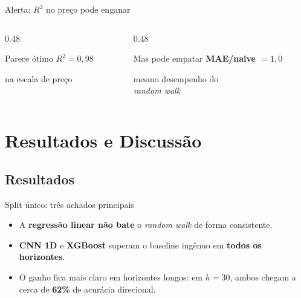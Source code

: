 \documentclass{libs/ufc_format}
\begin{document}
\begin{frame}{Alerta: \(R^2\) no preço pode enganar}
    \begin{columns}
        \begin{column}{0.48\textwidth}
            \begin{exampleblock}{Parece ótimo}
                \centering
                \Large \textbf{\(R^2 = 0{,}98\)}

                \vspace{0.3cm}
                \normalsize na escala de preço
            \end{exampleblock}
        \end{column}
        \begin{column}{0.48\textwidth}
            \begin{alertblock}{Mas pode empatar}
                \centering
                \Large \textbf{MAE/naive \(= 1{,}0\)}

                \vspace{0.3cm}
                \normalsize mesmo desempenho do\\ \emph{random walk}
            \end{alertblock}
        \end{column}
    \end{columns}

    \vspace{0.4cm}
\end{frame}

\section{Resultados e Discussão}
\subsection{Resultados}

\begin{frame}{Split único: três achados principais}
    \begin{itemize}
        \item A \textbf{regressão linear não bate} o \emph{random walk} de forma consistente.
        \item \textbf{CNN 1D} e \textbf{XGBoost} superam o baseline ingênuo em \textbf{todos os horizontes}.
        \item O ganho fica mais claro em horizontes longos: em \(h=30\), ambos chegam a cerca de \textbf{62\%} de acurácia direcional.
    \end{itemize}

    \vspace{0.3cm}
\end{frame}
\end{document}
